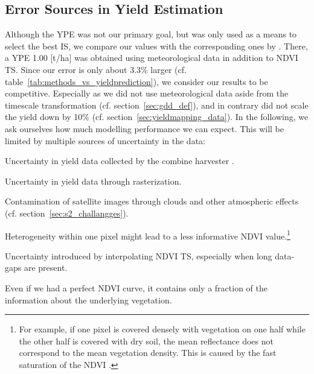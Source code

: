 {    \subsection{Error Sources in Yield Estimation}{\label{sec:discuss_high-rmse-in-yield-prdiction}
        Although the YPE was not our primary goal, but was only used as a means to select the best IS, we compare our values with the corresponding ones by \cite{perichPixelbasedCropYield2022}. There, a YPE 1.00 [t/ha] was obtained using meteorological data in addition to NDVI TS. Since our error is only about 3.3\% larger (cf. table~\ref{tab:methods_vs_yieldprediction}), we consider our results to be competitive. Especially as we did not use meteorological data aside from the timescale transformation (cf. section~\ref{sec:gdd_def}), and in contrary did not scale the yield down by 10\% (cf. section~\ref{sec:yieldmapping_data}). In the following, we ask ourselves how much modelling performance we can expect. This will be limited by multiple sources of uncertainty in the data:
        \begin{Nenumerate}
            \item Uncertainty in yield data collected by the combine harvester \citep{robinsonComparingPerformanceTechniques2005}.
            \item Uncertainty in yield data through rasterization.
            \item Contamination of satellite images through clouds and other atmospheric effects (cf. section~\ref{sec:s2_challangges}).
            \item Heterogeneity within one pixel might lead to a less informative NDVI value.\footnote{For example, if one pixel is covered densely with vegetation on one half while the other half is covered with dry soil, the mean reflectance does not correspond to the mean vegetation density. This is caused by the fast saturation of the NDVI \citep{guNDVISaturationAdjustment2013}.} 
            \item Uncertainty introduced by interpolating NDVI TS, especially when long data-gaps are present.
        \end{Nenumerate}
        Even if we had a perfect NDVI curve, it contains only a fraction of the information about the underlying vegetation. 
}}
